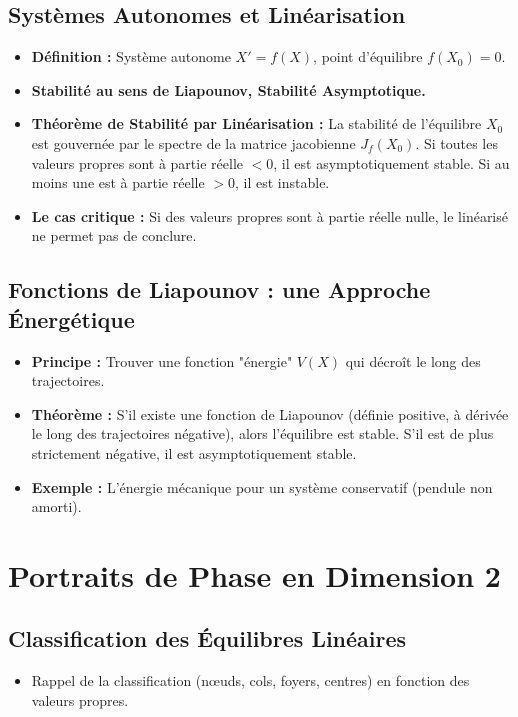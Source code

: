 \documentclass[12pt, a4paper, parskip=full]{report}
\theoremstyle{agregstyle}
\begin{document}
\subsection{Systèmes Autonomes et Linéarisation}
\begin{itemize}
    \item \textbf{Définition :} Système autonome $X'=f(X)$, point d'équilibre $f(X_0)=0$.
    \item \textbf{Stabilité au sens de Liapounov, Stabilité Asymptotique.}
    \item \textbf{Théorème de Stabilité par Linéarisation :} La stabilité de l'équilibre $X_0$ est gouvernée par le spectre de la matrice jacobienne $J_f(X_0)$. Si toutes les valeurs propres sont à partie réelle $<0$, il est asymptotiquement stable. Si au moins une est à partie réelle $>0$, il est instable.
    \item \textbf{Le cas critique :} Si des valeurs propres sont à partie réelle nulle, le linéarisé ne permet pas de conclure.
\end{itemize}
\subsection{Fonctions de Liapounov : une Approche Énergétique}
\begin{itemize}
    \item \textbf{Principe :} Trouver une fonction "énergie" $V(X)$ qui décroît le long des trajectoires.
    \item \textbf{Théorème :} S'il existe une fonction de Liapounov (définie positive, à dérivée le long des trajectoires négative), alors l'équilibre est stable. S'il est de plus strictement négative, il est asymptotiquement stable.
    \item \textbf{Exemple :} L'énergie mécanique pour un système conservatif (pendule non amorti).
\end{itemize}

\section{Portraits de Phase en Dimension 2}
\subsection{Classification des Équilibres Linéaires}
\begin{itemize}
    \item Rappel de la classification (nœuds, cols, foyers, centres) en fonction des valeurs propres.
\end{itemize}
\end{document}
